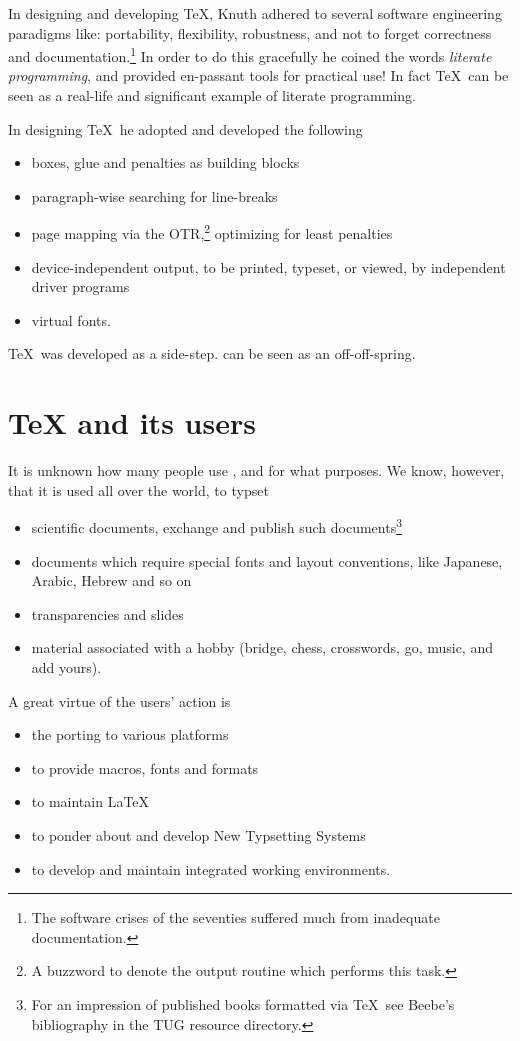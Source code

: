 In designing and developing \TeX,
Knuth adhered to several software engineering paradigms like:
portability, flexibility, robustness, and not to
forget correctness and documentation.\footnote{The software crises of the
   seventies suffered much from inadequate documentation.}
In order to do this gracefully
he coined the words {\em literate programming},
and provided en-passant tools for practical use!
In fact \TeX\ can be seen as
a real-life and significant example of literate programming.

In designing \TeX\ he adopted and developed the following
\begin{itemize}
\item boxes, glue and penalties as building blocks
\item paragraph-wise searching for line-breaks
\item page mapping via the OTR,\footnote{A buzzword to denote the
      output routine which performs this task.}
      optimizing for least penalties
\item device-independent output, to be printed, typeset, or viewed,
      by independent driver programs
\item virtual fonts.
\end{itemize}
\noindent \TeX\ was developed as a side-step. \MF{} can be seen as
an off-off-spring.

\section{\TeX{} and its users}
It is unknown how many people use \AllTeX, and for what purposes.
We know, however, that it is used all over the world, to typset
\begin{itemize}
\item scientific documents, exchange
      and publish such documents\footnote{For an impression of
   published books formatted via \TeX\ see Beebe's bibliography
   in the TUG resource directory.}
\item documents which require special fonts and layout
      conventions, like Japanese, Arabic, Hebrew and so on
\item transparencies and slides
\item material associated with a
      hobby (bridge, chess, crosswords, go, music, and add yours).
\end{itemize}
\noindent A great virtue of the users' action is
\begin{itemize}
\item the porting to various platforms
\item to provide macros, fonts and formats
\item to maintain \LaTeX
\item to ponder about and develop New Typsetting Systems
\item to develop and maintain integrated working environments.
\end{itemize}

